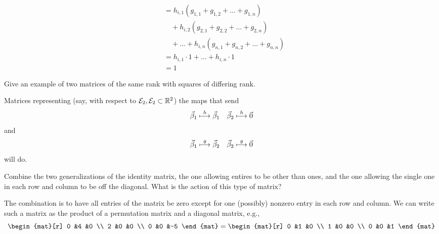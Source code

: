 \begin{exercises}
\begin{answer}
\begin{align*}
       &=h_{i,1}(g_{1,1}+g_{1,2}+\dots+g_{1,n})  \\
       &\text{}\quad+h_{i,2}(g_{2,1}+g_{2,2}+\dots+g_{2,n}) \\
       &\text{}\quad
        +\dots+h_{i,n}(g_{n,1}+g_{n,2}+\dots+g_{n,n})  \\
       &=h_{i,1}\cdot 1+\dots+h_{i,n}\cdot 1  \\
       &=1
     \end{align*}  
    \end{answer}
  \recommended \item
    Give an example of two matrices of the same rank with squares of
    differing rank.
    \begin{answer}
      Matrices representing (say, with respect to
      \( {\cal E}_2,{\cal E}_2\subset\mathbb{R}^2 \)) the maps that send
      \begin{equation*}
        \vec{\beta}_1 \stackrel{h}{\longmapsto} \vec{\beta}_1
        \quad
        \vec{\beta}_2 \stackrel{h}{\longmapsto} \vec{0}
      \end{equation*}
      and
      \begin{equation*}
        \vec{\beta}_1 \stackrel{g}{\longmapsto} \vec{\beta}_2
        \quad
        \vec{\beta}_2 \stackrel{g}{\longmapsto} \vec{0}
      \end{equation*}
      will do.  
    \end{answer}
  \item 
    Combine the two generalizations of the identity matrix,
    the one allowing entires to be other than ones, and the one allowing the
    single one in each row and column to be off the diagonal.
    What is the action of this type of matrix?
    \begin{answer}
      The combination is to have all entries of the matrix be zero
      except for one (possibly) nonzero entry in each row and column.
      We can write such a matrix as the product of a permutation matrix and
      a diagonal matrix, e.g.,
      \begin{equation*}
        \begin{mat}[r]
          0  &4  &0  \\
          2  &0  &0  \\
          0  &0  &-5
        \end{mat}
        =\begin{mat}[r]
          0  &1  &0  \\
          1  &0  &0  \\
          0  &0  &1
        \end{mat}

\end{equation*}
\end{answer}
\end{exercises}
